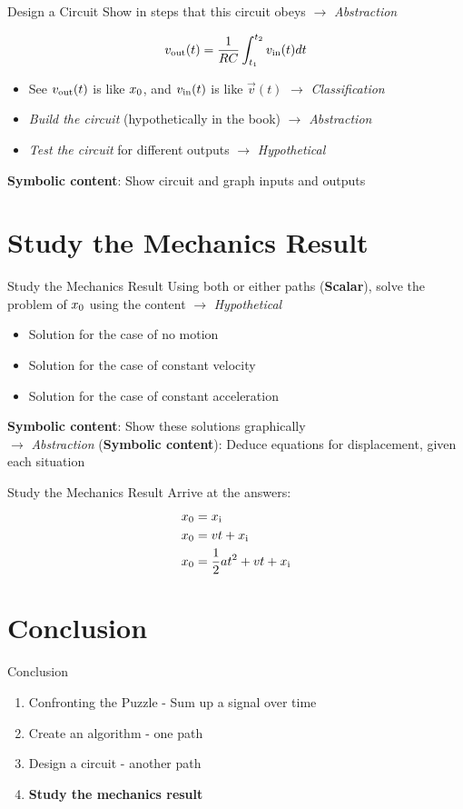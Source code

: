 \documentclass{beamer}
\begin{document}
\begin{frame}{Design a Circuit}
Show in steps that this circuit obeys $\to$ \textit{\alert{Abstraction}} \\
\begin{tcolorbox}
\begin{equation}
v_{\rm out} (t) = \frac{1}{RC} \int_{t_1}^{t_2} v_{\rm in}(t) dt
\end{equation}
\end{tcolorbox}
\begin{itemize}
\item See $v_{\rm out}(t)$ is like $x_{\rm 0}$, and $v_{\rm in}(t)$ is like $\vec{v}(t)$ $\to$ \textit{\alert{Classification}}
\item \textit{Build the circuit} (hypothetically in the book) $\to$ \textit{\alert{Abstraction}}
\item \textit{Test the circuit} for different outputs $\to$ \textit{\alert{Hypothetical}}
\end{itemize}
\alert{\textbf{Symbolic content}}: Show circuit and graph inputs and outputs
\end{frame}

\section{Study the Mechanics Result}

\begin{frame}{Study the Mechanics Result}
Using both or either paths (\textbf{Scalar}), solve the problem of $x_{\rm 0}$ using the content $\to$ \textit{\alert{Hypothetical}}
\begin{itemize}
\item Solution for the case of no motion
\item Solution for the case of constant velocity
\item Solution for the case of constant acceleration
\end{itemize}
\alert{\textbf{Symbolic content}}: Show these solutions graphically \\
$\to$ \textit{\alert{Abstraction}} (\alert{\textbf{Symbolic content}}): Deduce equations for displacement, given each situation
\end{frame}

\begin{frame}{Study the Mechanics Result}
Arrive at the answers: \\
\begin{align}
x_{\rm 0} &= x_{\rm i} \\
x_{\rm 0} &= vt + x_{\rm i} \\
x_{\rm 0} &= \frac{1}{2}at^2 + vt + x_{\rm i} 
\end{align}
\end{frame}

\section{Conclusion}

\begin{frame}{Conclusion}
\begin{enumerate}
\small
\item Confronting the Puzzle - Sum up a signal over time
\item Create an algorithm - one path
\item Design a circuit - another path
\item \textbf{\alert{Study the mechanics result}}
\end{enumerate}
\end{frame}
\end{document}
